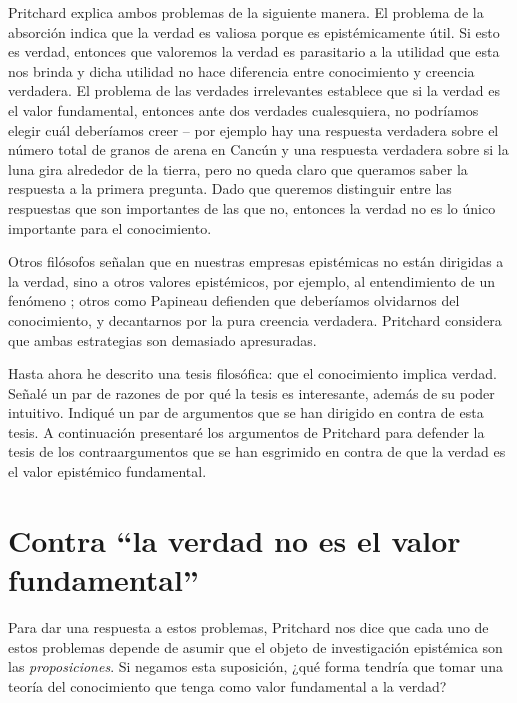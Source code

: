 \documentclass{article}
\begin{document}
Pritchard explica ambos problemas de la siguiente manera. El problema de la absorción indica que la verdad es valiosa porque es epistémicamente útil. Si esto es verdad, entonces que valoremos la verdad es parasitario a la utilidad que esta nos brinda y dicha utilidad no hace diferencia entre conocimiento y creencia verdadera. El problema de las verdades irrelevantes establece que si la verdad es el valor fundamental, entonces ante dos verdades cualesquiera, no podríamos elegir cuál deberíamos creer -- por ejemplo hay una respuesta verdadera sobre el número total de granos de arena en Cancún y una respuesta verdadera sobre si la luna gira alrededor de la tierra, pero no queda claro que queramos saber la respuesta a la primera pregunta. Dado que queremos distinguir entre las respuestas que son importantes de las que no, entonces la verdad no es lo único importante para el conocimiento.

Otros filósofos señalan que en nuestras empresas epistémicas no están dirigidas a la verdad, sino a otros valores epistémicos, por ejemplo, al entendimiento de un fenómeno \cite{Elgin2004}; otros como Papineau \citeyear{Papineau2021} defienden que deberíamos olvidarnos del conocimiento, y decantarnos por la pura creencia verdadera. Pritchard considera que ambas estrategias son demasiado apresuradas.

Hasta ahora he descrito una tesis filosófica: que el conocimiento implica verdad. Señalé un par de razones de por qué la tesis es interesante, además de su poder intuitivo. Indiqué un par de argumentos que se han dirigido en contra de esta tesis. A continuación presentaré los argumentos de Pritchard para defender la tesis de los contraargumentos que se han esgrimido en contra de que la verdad es el valor epistémico fundamental.

\section{Contra ``la verdad no es el valor fundamental''}

\noindent Para dar una respuesta a estos problemas, Pritchard nos dice que cada uno de estos problemas depende de asumir que el objeto de investigación epistémica son las \textit{proposiciones}. Si negamos esta suposición, ¿qué forma tendría que tomar una teoría del conocimiento que tenga como valor fundamental a la verdad?
\end{document}
